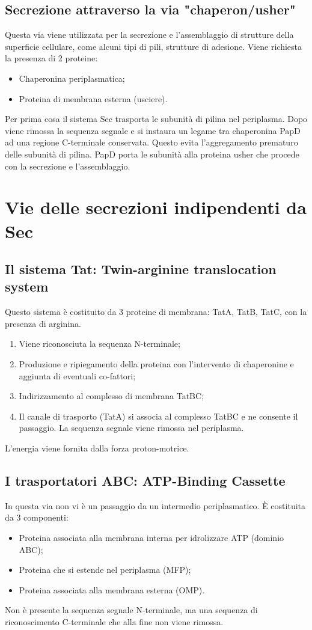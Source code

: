 \subsection{Secrezione attraverso la via "chaperon/usher"}
Questa via viene utilizzata per la secrezione e l'assemblaggio di strutture della superficie cellulare, come alcuni tipi di pili, strutture di adesione. Viene richiesta la presenza di 2 proteine:
\begin{itemize}
    \item Chaperonina periplasmatica; 
    \item Proteina di membrana esterna (usciere).
\end{itemize}
Per prima cosa il sistema Sec trasporta le subunit\`a di pilina nel periplasma. Dopo viene rimossa la sequenza segnale e si instaura un legame tra chaperonina PapD ad una regione C-terminale conservata. Questo evita l'aggregamento prematuro delle subunit\`a di pilina. PapD porta le subunit\`a alla proteina usher che procede con la secrezione e l'assemblaggio.
\section{Vie delle secrezioni indipendenti da Sec}
\subsection{Il sistema Tat: Twin-arginine translocation system}
Questo sistema \`e costituito da 3 proteine di membrana: TatA, TatB, TatC, con la presenza di arginina. 
\begin{enumerate}
    \item Viene riconosciuta la sequenza N-terminale; 
    \item Produzione e ripiegamento della proteina con l'intervento di chaperonine e aggiunta di eventuali co-fattori; 
    \item Indirizzamento al complesso di membrana TatBC; 
    \item Il canale di trasporto  (TatA) si associa al complesso TatBC e ne consente il passaggio. La sequenza segnale viene rimossa nel periplasma. 
\end{enumerate}
L'energia viene fornita dalla forza proton-motrice. 
\subsection{I trasportatori ABC: ATP-Binding Cassette}
In questa via non vi \`e un passaggio da un intermedio periplasmatico. \`E costituita da 3 componenti:
\begin{itemize}
    \item Proteina associata alla membrana interna per idrolizzare ATP (dominio ABC); 
    \item Proteina che si estende nel periplasma (MFP); 
    \item Proteina associata alla membrana esterna (OMP).
\end{itemize}
Non \`e presente la sequenza segnale N-terminale, ma una sequenza di riconoscimento C-terminale che alla fine non viene rimossa. 
